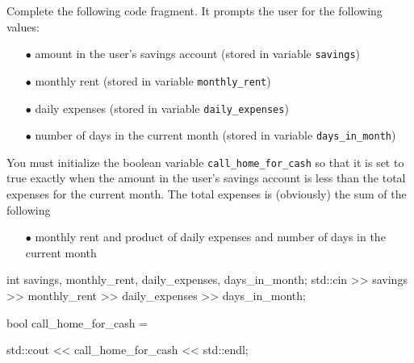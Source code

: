 \nextq
Complete the following code fragment.
It prompts the user for the following values:
\begin{enumerate}
\item[$\bullet$] amount in the user's savings account (stored in variable \verb!savings!)
\item[$\bullet$] monthly rent (stored in variable \verb!monthly_rent!)
\item[$\bullet$] daily expenses (stored in variable \verb!daily_expenses!)
\item[$\bullet$] number of days in the current month (stored in variable \verb!days_in_month!)
\end{enumerate}
You must initialize the boolean variable \verb!call_home_for_cash! so that it is set to true exactly when the amount in the user's savings account is less than the total expenses for the current month. The total expenses is (obviously) the sum of the following
\begin{enumerate}
\item[$\bullet$]monthly rent and product of daily expenses and number of days in the current month
\end{enumerate}
\ANSWER
\begin{answercode}
int savings, monthly_rent, daily_expenses, days_in_month;
std::cin >> savings >> monthly_rent >> daily_expenses
         >> days_in_month;

bool call_home_for_cash =

std::cout << call_home_for_cash << std::endl;
\end{answercode}


